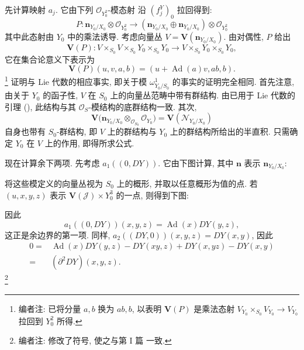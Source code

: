 先计算映射 \(a_j\). 它由下列 \(\mathscr O_{Y_0^2}\)-模态射
沿 \((f_j^Y)_0\) 拉回得到:
\[
 P:\mathbf n_{Y_0/X_0}\otimes\mathscr O_{Y_0^2}
 \longrightarrow
 (\mathbf n_{Y_0/X_0}\oplus \mathbf n_{Y_0/X_0})
 \otimes\mathscr O_{Y_0^2}
\]
其中此态射由 \(Y_0\) 中的乘法诱导.
考虑向量丛 \(V=\mathbf V(\mathbf n_{Y_0/X_0})\).
由对偶性, \(P\) 给出
\[
 \mathbf V(P):
 V\times_{S_0}V\times_{S_0}Y_0\times_{S_0}Y_0
 \longrightarrow V\times_{S_0}Y_0\times_{S_0}Y_0,
\]
它在集合论意义下表示为
\[
 \mathbf V(P)(u,v,a,b)=(u+\operatorname{Ad}(a)v,ab,b).
\]
\footnote{编者注: 已将分量 \(a,b\) 换为 \(ab,b\),
以表明 \(\mathbf V(P)\) 是乘法态射
\(V_{Y_0}\times_{S_0}V_{Y_0}\to V_{Y_0}\) 拉回到 \(Y_0^2\) 所得.}
证明与 Lie 代数的相应事实, 即关于模 \(\omega^1_{Y_0/S_0}\) 的事实的证明完全相同.
首先注意, 由关于 \(Y_0\) 的函子性, \(V\) 在 \(S_0\) 上的向量丛范畴中带有群结构.
由已用于 Lie 代数的引理 (),
此结构与其 \(\mathscr O_S\)-模结构的底群结构一致. 其次,
\[
 \mathbf V\bigl(\mathbf n_{Y_0/X_0}
   \otimes_{\mathscr O_{S_0}}\mathscr O_{Y_0}\bigr)
 =\mathbf V(\mathscr N_{Y_0/X_0})
\]
自身也带有 \(S_0\)-群结构, 即 \(V\) 上的群结构与
\(Y_0\) 上的群结构所给出的半直积.
只需确定 \(Y_0\) 在 \(V\) 上的作用, 即得所求公式.

现在计算余下两项. 先考虑 \(a_1((0,DY))\).
它由下图计算, 其中 \(\mathbf n\) 表示 \(\mathbf n_{Y_0/X_0}\):

\begin{center}
\end{center}

将这些模定义的向量丛视为 \(S_0\) 上的概形,
并取以任意概形为值的点. 若 \((u,x,y,z)\) 表示
\(\mathbf V(\mathscr J)\times Y_0^3\) 的一点, 则得到下图:

\begin{center}
\end{center}

因此
\[
 a_1((0,DY))(x,y,z)
 =\operatorname{Ad}(x)DY(y,z),
\]
这正是余边界的第一项. 同样,
\(a_2((DY,0))(x,y,z)=DY(x,y)\), 因此
\[
 \begin{aligned}
 0={}&\operatorname{Ad}(x)DY(y,z)-DY(xy,z)
      +DY(x,yz)-DY(x,y)\\
   ={}&(\partial^2DY)(x,y,z).
 \end{aligned}
\]
\footnote{编者注: 修改了符号, 使之与第 I 篇 一致.}

